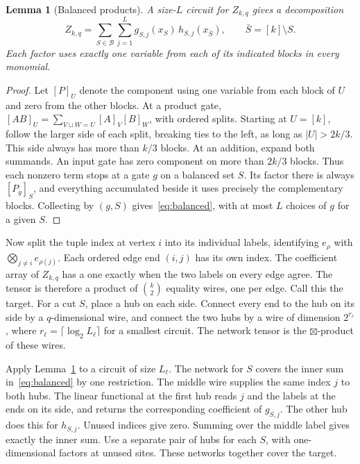 \documentclass[11pt,letterpaper]{article}
\newtheorem{lemma}[theorem]{Lemma}
\theoremstyle{importstyle}
\newcommand{\bal}{\mathcal B}
\begin{document}
\begin{lemma}[Balanced products]\label{lem:balanced}
A size-\(L\) circuit for \(Z_{k,q}\) gives a decomposition
\begin{equation}
 Z_{k,q}=\sum_{S\in\bal}\sum_{j=1}^{L}
              g_{S,j}(x_S)\,h_{S,j}(x_{\bar S}), \qquad
              \bar S=[k]\setminus S .
 \label{eq:balanced}
\end{equation}
Each factor uses exactly one variable from each of its indicated
blocks in every monomial.
\end{lemma}

\begin{proof}
Let \([P]_U\) denote the component using one variable from
each block of \(U\) and zero from the other blocks. At a product gate,
\([AB]_U=\sum_{V\sqcup W=U}[A]_V[B]_W\), with ordered splits.
Starting at \(U=[k]\), follow the larger side of each split, breaking
ties to the left, as long as \(|U|>2k/3\). This side always has more
than \(k/3\) blocks. At an addition, expand both summands. An input
gate has zero component on more than \(2k/3\) blocks. Thus each
nonzero term stops at a gate \(g\) on a balanced set \(S\).
Its factor there is always \([P_g]_S\), and everything accumulated
beside it uses precisely the complementary blocks. Collecting by
\((g,S)\) gives~\eqref{eq:balanced}, with at most \(L\) choices of
\(g\) for a given \(S\).
\end{proof}

Now split the tuple index at vertex \(i\) into its individual labels,
identifying \(e_\rho\) with \(\bigotimes_{j\ne i}e_{\rho(j)}\).
Each ordered edge end \((i,j)\) has its own index. The coefficient
array of \(Z_{k,q}\) has a one exactly when the two labels
on every edge agree. The tensor is therefore a product of
\(\binom{k}{2}\) equality wires, one per edge. Call this the target.
For a cut \(S\), place a hub on each side. Connect every end to the hub
on its side by a \(q\)-dimensional wire, and connect the two hubs by
a wire of dimension \(2^{r_\ell}\), where \(r_\ell=\lceil\log_2 L_\ell\rceil\) for a smallest circuit.
The network tensor is the \(\boxtimes\)-product of these wires.

Apply Lemma~\ref{lem:balanced} to a circuit of size \(L_\ell\).
The network for \(S\) covers the inner sum in~\eqref{eq:balanced} by
one restriction. The middle wire supplies the same index \(j\) to
both hubs. The linear functional at the first hub reads \(j\) and the
labels at the ends on its side, and returns the corresponding coefficient
of \(g_{S,j}\). The other hub does this for \(h_{S,j}\). Unused
indices give zero. Summing over the middle label gives exactly the
inner sum. Use a separate pair of hubs for each \(S\), with
one-dimensional factors at unused sites. These networks together cover
the target.
\end{document}
